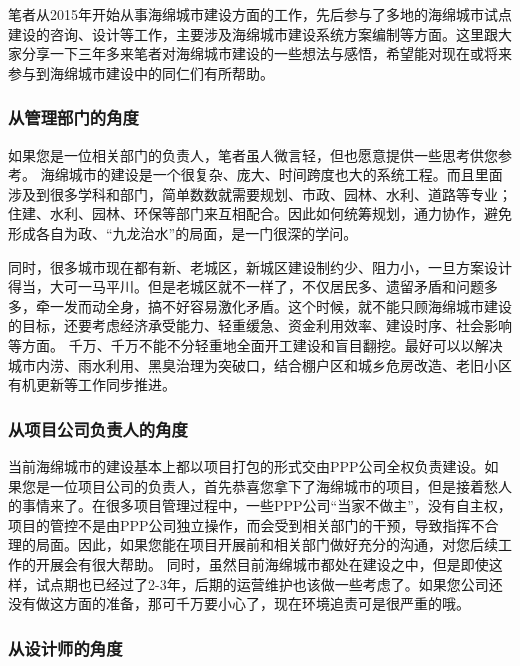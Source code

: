 \documentclass[
]{book}
\begin{document}
笔者从2015年开始从事海绵城市建设方面的工作，先后参与了多地的海绵城市试点建设的咨询、设计等工作，主要涉及海绵城市建设系统方案编制等方面。这里跟大家分享一下三年多来笔者对海绵城市建设的一些想法与感悟，希望能对现在或将来参与到海绵城市建设中的同仁们有所帮助。

\hypertarget{ux4eceux7ba1ux7406ux90e8ux95e8ux7684ux89d2ux5ea6}{%
\subsubsection{从管理部门的角度}\label{ux4eceux7ba1ux7406ux90e8ux95e8ux7684ux89d2ux5ea6}}

如果您是一位相关部门的负责人，笔者虽人微言轻，但也愿意提供一些思考供您参考。
海绵城市的建设是一个很复杂、庞大、时间跨度也大的系统工程。而且里面涉及到很多学科和部门，简单数数就需要规划、市政、园林、水利、道路等专业；住建、水利、园林、环保等部门来互相配合。因此如何统筹规划，通力协作，避免形成各自为政、``九龙治水''的局面，是一门很深的学问。

同时，很多城市现在都有新、老城区，新城区建设制约少、阻力小，一旦方案设计得当，大可一马平川。但是老城区就不一样了，不仅居民多、遗留矛盾和问题多多，牵一发而动全身，搞不好容易激化矛盾。这个时候，就不能只顾海绵城市建设的目标，还要考虑经济承受能力、轻重缓急、资金利用效率、建设时序、社会影响等方面。
千万、千万不能不分轻重地全面开工建设和盲目翻挖。最好可以以解决城市内涝、雨水利用、黑臭治理为突破口，结合棚户区和城乡危房改造、老旧小区有机更新等工作同步推进。

\hypertarget{ux4eceux9879ux76eeux516cux53f8ux8d1fux8d23ux4ebaux7684ux89d2ux5ea6}{%
\subsubsection{从项目公司负责人的角度}\label{ux4eceux9879ux76eeux516cux53f8ux8d1fux8d23ux4ebaux7684ux89d2ux5ea6}}

当前海绵城市的建设基本上都以项目打包的形式交由PPP公司全权负责建设。如果您是一位项目公司的负责人，首先恭喜您拿下了海绵城市的项目，但是接着愁人的事情来了。在很多项目管理过程中，一些PPP公司``当家不做主''，没有自主权，项目的管控不是由PPP公司独立操作，而会受到相关部门的干预，导致指挥不合理的局面。因此，如果您能在项目开展前和相关部门做好充分的沟通，对您后续工作的开展会有很大帮助。
同时，虽然目前海绵城市都处在建设之中，但是即使这样，试点期也已经过了2-3年，后期的运营维护也该做一些考虑了。如果您公司还没有做这方面的准备，那可千万要小心了，现在环境追责可是很严重的哦。

\hypertarget{ux4eceux8bbeux8ba1ux5e08ux7684ux89d2ux5ea6}{%
\subsubsection{从设计师的角度}\label{ux4eceux8bbeux8ba1ux5e08ux7684ux89d2ux5ea6}}
\end{document}
